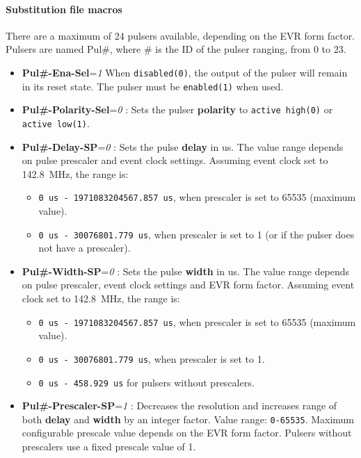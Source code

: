 \documentclass[12pt,a4paper]{article}
\begin{document}
\paragraph{Substitution file macros}
There are a maximum of 24 pulsers available, depending on the EVR form factor. Pulsers are named Pul\#, where \# is the ID of the pulser ranging, from 0 to 23.
\begin{itemize}
  \item
    \textbf{Pul\#-Ena-Sel}=\emph{1} When \texttt{disabled(0)}, the output of the pulser will remain in its reset state. The pulser must be \texttt{enabled(1)} when used.
  \item
    \textbf{Pul\#-Polarity-Sel}=\emph{0} : Sets the pulser \textbf{polarity} to \texttt{active high(0)} or \texttt{active low(1)}.
  \item
    \textbf{Pul\#-Delay-SP}=\emph{0} : Sets the pulse \textbf{delay} in us. The value range depends on pulse prescaler and event clock settings. Assuming event clock set to 142.8~MHz, the range is:
        \begin{itemize}
    	    \item \texttt{0 us - 1971083204567.857 us}, when prescaler is set to 65535 (maximum value).
    	    \item \texttt{0 us - 30076801.779 us}, when prescaler is set to 1 (or if the pulser does not have a prescaler).
        \end{itemize}
  \item
    \textbf{Pul\#-Width-SP}=\emph{0} : Sets the pulse \textbf{width} in us. The value range depends on pulse prescaler, event clock settings and EVR form factor. Assuming event clock set to 142.8~MHz, the range is:
    \begin{itemize}
	    \item \texttt{0 us - 1971083204567.857 us}, when prescaler is set to 65535 (maximum value).
	    \item \texttt{0 us - 30076801.779 us}, when prescaler is set to 1.
	    \item \texttt{0 us - 458.929 us} for pulsers without prescalers.
    \end{itemize}
  \item
    \textbf{Pul\#-Prescaler-SP}=\emph{1} : Decreases the resolution and increases range of both \textbf{delay} and \textbf{width} by an integer factor. Value range: \texttt{0-65535}. Maximum configurable prescale value depends on the EVR form factor. Pulsers without prescalers use a fixed prescale value of 1.
  \end{itemize}
\end{document}
